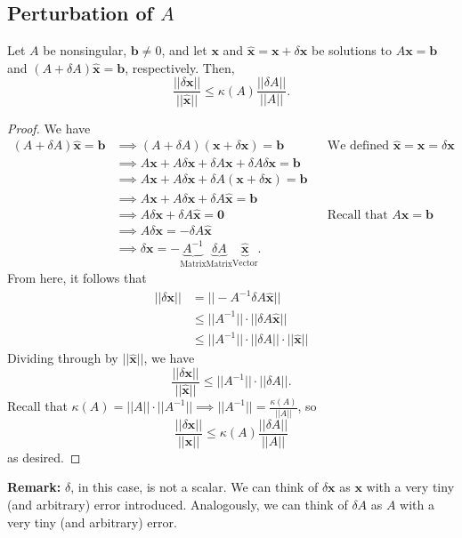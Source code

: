 \documentclass[letterpaper]{article}
\newcommand{\0}{\mathbf{0}}
\renewcommand{\b}{\mathbf{b}}
\newcommand{\x}{\mathbf{x}}
\begin{document}
\subsection{Perturbation of \texorpdfstring{$A$}{A}}
\begin{theorem}{}{}
    Let $A$ be nonsingular, $\b \neq 0$, and let $\x$ and $\hat{\x} = \x + \delta \x$ be solutions to $A\x = \b$ and $(A + \delta A) \hat{\x} = \b$, respectively. Then, 
    \[\frac{||\delta \x||}{||\hat{\x}||} \leq \kappa(A) \frac{||\delta A||}{||A||}.\]
\end{theorem}

\begin{proof}
    We have 
    \begin{equation*}
        \begin{aligned}
            (A + \delta A) \hat{\x} = \b &\implies (A + \delta A) (\x + \delta\x) = \b && \text{We defined } \hat{\x} = \x = \delta\x \\ 
                &\implies A\x + A\delta\x + \delta A\x + \delta A \delta \x = \b \\ 
                &\implies A\x + A\delta\x + \delta A (\x + \delta \x) = \b \\ 
                &\implies A\x + A\delta\x + \delta A \hat{\x} = \b \\ 
                &\implies A\delta\x + \delta A \hat{\x} = \0 && \text{Recall that } A\x = \b \\ 
                &\implies A\delta \x = -\delta A \hat{\x} \\ 
                &\implies \delta\x = -\underbrace{A^{-1}}_{\text{Matrix}} \underbrace{\delta A}_{\text{Matrix}} \underbrace{\hat{\x}}_{\text{Vector}}.
        \end{aligned}
    \end{equation*}
    From here, it follows that
    \begin{equation*}
        \begin{aligned}
            ||\delta\x|| &= ||-A^{-1} \delta A\hat{\x}|| \\ 
                &\leq ||A^{-1}|| \cdot ||\delta A \hat{\x}|| \\ 
                &\leq ||A^{-1}|| \cdot ||\delta A|| \cdot ||\hat{\x}||
        \end{aligned}
    \end{equation*}
    Dividing through by $||\hat{\x}||$, we have 
    \[\frac{||\delta\x||}{||\hat{\x}||} \leq ||A^{-1}|| \cdot ||\delta A||.\]
    Recall that $\kappa(A) = ||A|| \cdot ||A^{-1}|| \implies ||A^{-1}|| = \frac{\kappa(A)}{||A||}$, so 
    \[\frac{||\delta\x||}{||\hat{\x}||} \leq \kappa(A) \frac{||\delta A||}{||A||}\] 
    as desired.
\end{proof}
\textbf{Remark:} $\delta$, in this case, is not a scalar. We can think of $\delta\x$ as $\x$ with a very tiny (and arbitrary) error introduced. Analogously, we can think of $\delta A$ as $A$ with a very tiny (and arbitrary) error. 
\end{document}
